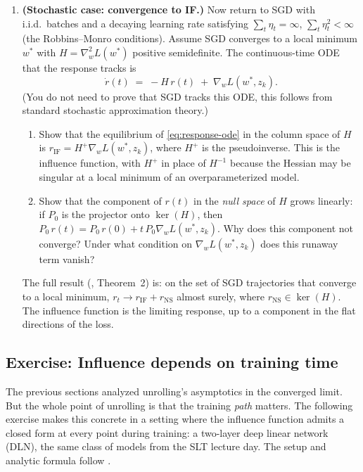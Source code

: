 \documentclass[11pt]{article}
\begin{document}
\begin{exercise}
\begin{enumerate}
  Take $K\to\infty$ (assuming $\eta < 2/\lambda_{\max}(H)$) and recover the influence function $r_\infty = -H^{-1}\nabla_w L(w^*,z_k) = r_{\mathrm{IF}}$.

  \item[(c)] \textbf{(Stochastic case: convergence to IF.)} Now return to SGD with i.i.d.\ batches and a decaying learning rate satisfying $\sum_t \eta_t = \infty$, $\sum_t \eta_t^2 < \infty$ (the Robbins--Monro conditions). Assume SGD converges to a local minimum $w^*$ with $H = \nabla_w^2 L(w^*)$ positive semidefinite. The continuous-time ODE that the response tracks is
  \begin{equation}\label{eq:response-ode}
    \dot{r}(t) \;=\; -H\,r(t) \;+\; \nabla_w L(w^*,z_k).
  \end{equation}
  (You do not need to prove that SGD tracks this ODE, this follows from standard stochastic approximation theory.)
  \begin{enumerate}
    \item[i.] Show that the equilibrium of \eqref{eq:response-ode} in the column space of $H$ is $r_{\mathrm{IF}} = H^+\nabla_w L(w^*,z_k)$, where $H^+$ is the pseudoinverse. This is the influence function, with $H^+$ in place of $H^{-1}$ because the Hessian may be singular at a local minimum of an overparameterized model.
    \item[ii.] Show that the component of $r(t)$ in the \emph{null space} of $H$ grows linearly: if $P_0$ is the projector onto $\ker(H)$, then $P_0\,r(t) = P_0\,r(0) + t\,P_0\nabla_w L(w^*,z_k)$. Why does this component not converge? Under what condition on $\nabla_w L(w^*,z_k)$ does this runaway term vanish?
  \end{enumerate}

  The full result (\citet{mlodozeniec2025distributional}, Theorem~2) is: on the set of SGD trajectories that converge to a local minimum, $r_t \to r_{\mathrm{IF}} + r_{\mathrm{NS}}$ almost surely, where $r_{\mathrm{NS}} \in \ker(H)$. The influence function is the limiting response, up to a component in the flat directions of the loss.
\end{enumerate}
\end{exercise}


\subsection{Exercise: Influence depends on training time}\label{subsec:dln-exercise}

The previous sections analyzed unrolling's asymptotics in the converged limit. But the whole point of unrolling is that the training \emph{path} matters. The following exercise makes this concrete in a setting where the influence function admits a closed form at every point during training: a two-layer deep linear network (DLN), the same class of models from the SLT lecture day. The setup and analytic formula follow \citet{lee2025stagewise}.
\end{document}
